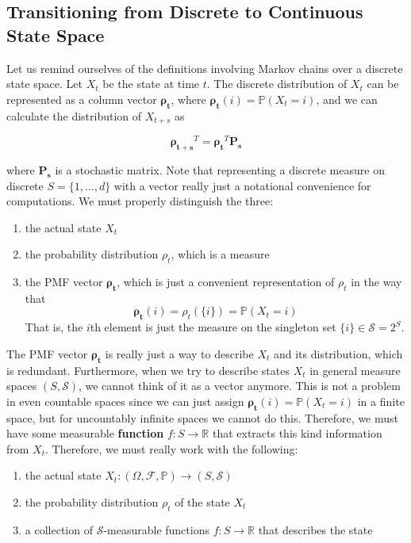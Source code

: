 \documentclass{article}
\theoremstyle{definition}
\theoremstyle{remark}
\theoremstyle{definition}
\begin{document}
  \subsection{Transitioning from Discrete to Continuous State Space}

    Let us remind ourselves of the definitions involving Markov chains over a discrete state space. Let $X_t$ be the state at time $t$. The discrete distribution of $X_t$ can be represented as a column vector $\boldsymbol{\rho_t}$, where $\boldsymbol{\rho_t} (i) = \mathbb{P}(X_t = i)$, and we can calculate the distribution of $X_{t + s}$ as 

      \[\boldsymbol{\rho_{t + s}}^T = \boldsymbol{\rho_{t}}^T \boldsymbol{P_s} \]

    where $\boldsymbol{P_s}$ is a stochastic matrix. Note that representing a discrete measure on discrete $S = \{1, \ldots, d\}$ with a vector really just a notational convenience for computations. We must properly distinguish the three: 

    \begin{enumerate}
      \item the actual state $X_t$ 
      \item the probability distribution $\rho_t$, which is a measure 
      \item the PMF vector $\boldsymbol{\rho_t}$, which is just a convenient representation of $\rho_t$ in the way that 
      \[\boldsymbol{\rho_t} (i) = \rho_t (\{i\}) = \mathbb{P}(X_t = i)\]
      That is, the $i$th element is just the measure on the singleton set $\{i\} \in \mathcal{S} = 2^S$. 
    \end{enumerate}

    The PMF vector $\boldsymbol{\rho_t}$ is really just a way to describe $X_t$ and its distribution, which is redundant. Furthermore, when we try to describe states $X_t$ in general measure spaces $(S, \mathcal{S})$, we cannot think of it as a vector anymore. This is not a problem in even countable spaces since we can just assign $\boldsymbol{\rho_t} (i) = \mathbb{P}(X_t = i)$ in a finite space, but for uncountably infinite spaces we cannot do this. Therefore, we must have some measurable \textbf{function} $f: S \rightarrow \mathbb{R}$ that extracts this kind information from $X_{t}$. Therefore, we must really work with the following: 

    \begin{enumerate}
      \item the actual state $X_t: (\Omega, \mathcal{F}, \mathbb{P}) \longrightarrow (S, \mathcal{S})$ 
      \item the probability distribution $\rho_t$ of the state $X_t$ 
      \item a collection of $\mathcal{S}$-measurable functions $f: S \longrightarrow \mathbb{R}$ that describes the state 
    \end{enumerate}
\end{document}
